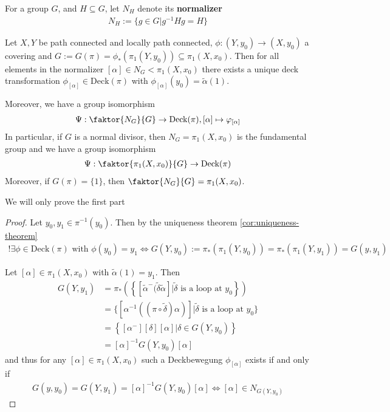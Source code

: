 For a group $G$, and $H \subseteq G$, let $N_H$ denote its \textbf{normalizer}
\begin{align*}
  N_H := \{g \in G \big\vert g^{-1}Hg = H\}
\end{align*}
\begin{thm}
  Let $X,Y$ be path connected and locally path connected, $\phi:(Y,y_0) \to (X,y_0)$ a covering and $G := G(\pi) = \phi_{\ast}(\pi_1(Y,y_0)) \subseteq \pi_1(X,x_0)$.
  Then for all elements in the normalizer $[\alpha] \in N_G < \pi_1(X,x_0)$ there exists a unique deck transformation $\phi_{[\alpha]} \in \text{Deck}(\pi)$ with $\phi_{[\alpha]}(y_0) = \tilde{\alpha}(1)$.

  Moreover, we have a group isomorphism
  \begin{align*}
    \Psi: \faktor{N_G}{G} \to  \text{Deck}(\pi), [\alpha] \mapsto  \phi_{[\alpha]} 
  \end{align*}
  In particular, if $G$ is a normal divisor, then $N_G = \pi_1(X,x_0)$ is the fundamental group and we have a group isomorphism
  \begin{align*}
    \Psi: \faktor{\pi_1(X,x_0)}{G} \to \text{Deck}(\pi)
  \end{align*}
  Moreover, if $G(\pi) = \{1\}$, then $\faktor{N_G}{G} = \pi_1(X,x_0)$.
\end{thm}
We will only prove the first part
\begin{proof}
  Let $y_0,y_1 \in \pi^{-1}(y_0)$. Then by the uniqueness theorem \ref{cor:uniqueness-theorem}
  \begin{align*}
    !\exists \phi \in \text{Deck}(\pi) \text{ with } \phi(y_0) = y_1 \iff G(Y,y_0) := \pi_{\ast}(\pi_1(Y,y_0))= \pi_{\ast}(\pi_1(Y,y_1)) = G(y,y_1)
  \end{align*}

  Let $[\alpha] \in \pi_1(X,x_0)$ with $\tilde{\alpha}(1) = y_1$. Then
  \begin{align*}
    G(Y,y_1) 
    &= \pi_{\ast}\left(
      \left\{
        [\tilde{\alpha}^{-} (\tilde{\delta} \tilde{\alpha}] \big\vert \tilde{\delta} \text{ is a loop at } y_0
      \right\}
    \right)\\
    &= \{\left[\alpha^{-1}\left(
        (\pi \circ \tilde{\delta}) \alpha
    \right)\right]
    \big\vert \tilde{\delta} \text{ is a loop at }y_0
  \}
  \\
    &=
    \left\{[\alpha^{-}][\delta][\alpha] \big\vert \delta \in G(Y,y_0)\right\}\\
    &=
    [\alpha]^{-1} G(Y,y_0)[\alpha]
  \end{align*}
  and thus for any $[\alpha] \in \pi_1(X,x_0)$ such a Deckbewegung $\phi_{[\alpha]}$ exists if and only if
  \begin{align*}
    G(y,y_0) = G(Y,y_1)  = [\alpha]^{-1} G(Y,y_0)[\alpha] \iff [\alpha] \in N_{G(Y,y_0)}
  \end{align*}
\end{proof}

